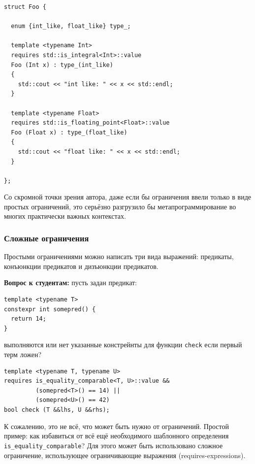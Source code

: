 \documentclass[a4paper,12pt,oneside]{article}
\newif\ifanswers
\begin{document}
\begin{lstlisting}
struct Foo {

  enum {int_like, float_like} type_;

  template <typename Int>
  requires std::is_integral<Int>::value
  Foo (Int x) : type_(int_like)
  {
    std::cout << "int like: " << x << std::endl;
  }

  template <typename Float>
  requires std::is_floating_point<Float>::value
  Foo (Float x) : type_(float_like)
  {
    std::cout << "float like: " << x << std::endl;
  }

};
\end{lstlisting}

Со скромной точки зрения автора, даже если бы ограничения ввели только в виде простых ограничений, это серьёзно разгрузило бы метапрограммирование во многих практически важных контекстах.

\subsubsection{Сложные ограничения}

Простыми ограничениями можно написать три вида выражений: предикаты, конъюнкции предикатов и дизъюнкции предикатов.

\textbf{Вопрос к студентам:} пусть задан предикат:

\begin{lstlisting}
template <typename T>
constexpr int somepred() {
  return 14;
}
\end{lstlisting}

выполняются или нет указанные констрейнты для функции \lstinline!check! если первый терм ложен?

\begin{lstlisting}
template <typename T, typename U>
requires is_equality_comparable<T, U>::value &&
         (somepred<T>() == 14) || 
         (somepred<U>() == 42)
bool check (T &&lhs, U &&rhs);
\end{lstlisting}

\ifanswers
Правильный ответ: конечно нет, так как \lstinline!false && true || false! по обычной схеме дает false
\fi

К сожалению, это не всё, что может быть нужно от ограничений. Простой пример: как избавиться от всё ещё необходимого шаблонного определения \lstinline!is_equality_comparable!? Для этого может быть использовано сложное ограничение, использующее ограничивающие выражения (requires-expressions).
\end{document}
